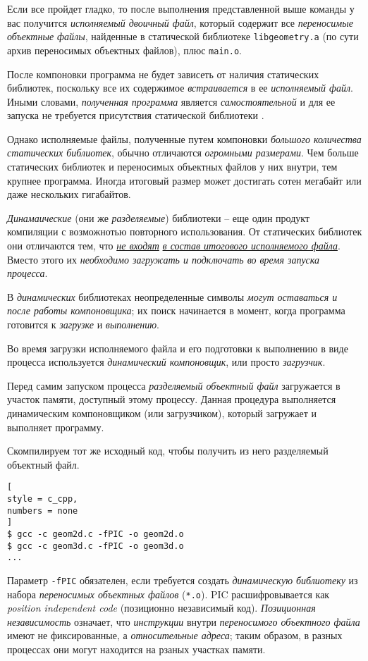 \documentclass[%
	11pt,
	a4paper,
	utf8,
		]{article}
\begin{document}
Если все пройдет гладко, то после выполнения представленной выше команды у вас получится \emph{исполняемый двоичный файл}, который содержит все \emph{переносимые объектные файлы}, найденные в статической библиотеке \verb|libgeometry.a| (по сути архив переносимых объектных файлов), плюс \verb|main.o|.

После компоновки программа не будет зависеть от наличия статических библиотек, поскольку все их содержимое \emph{встраивается} в ее \emph{исполняемый файл}. Иными словами, \emph{полученная программа} является \emph{самостоятельной} и для ее запуска не требуется присутствия статической библиотеки \cite[]{amini-extreme-c:2022}.

Однако исполняемые файлы, полученные путем компоновки \emph{большого количества статических библиотек}, обычно отличаются \emph{огромными размерами}. Чем больше статических библиотек и переносимых объектных файлов у них внутри, тем крупнее программа. Иногда итоговый размер может достигать сотен мегабайт или даже нескольких гигабайтов.

\emph{Динамаические} (они же \emph{разделяемые}) библиотеки -- еще один продукт компиляции с возможнотью повторного использования. От статических библиотек они отличаются тем, что \underline{\itshape не входят} \underline{\itshape в состав итогового исполняемого файла}. Вместо этого их \emph{необходимо загружать и подключать во время запуска процесса}.

В \emph{динамических} библиотеках неопределенные символы \emph{могут оставаться и после работы компоновщика}; их поиск начинается в момент, когда программа готовится к \emph{загрузке} и \emph{выполнению}. 

Во время загрузки исполняемого файла и его подготовки к выполнению в виде процесса используется \emph{динамический компоновщик}, или просто \emph{загрузчик}.

Перед самим запуском процесса \emph{разделяемый объектный файл} загружается в участок памяти, доступный этому процессу. Данная процедура выполняется динамическим компоновщиком (или загрузчиком), который загружает и выполняет программу.

Скомпилируем тот же исходный код, чтобы получить из него разделяемый объектный файл.
\begin{lstlisting}[
style = c_cpp,
numbers = none
]
$ gcc -c geom2d.c -fPIC -o geom2d.o
$ gcc -c geom3d.c -fPIC -o geom3d.o
...
\end{lstlisting}

Параметр \verb|-fPIC| обязателен, если требуется создать \emph{динамическую библиотеку} из набора \emph{переносимых объектных файлов} (\verb|*.o|). PIC расшифровывается как \emph{position independent code} (позиционно независимый код). \emph{Позиционная независимость} означает, что \emph{инструкции} внутри \emph{переносимого объектного файла} имеют не фиксированные, а \emph{относительные адреса}; таким образом, в разных процессах они могут находится на рзаных участках памяти. 
\end{document}
